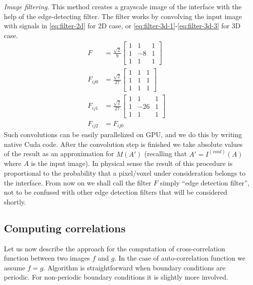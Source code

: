 \documentclass[reprint,amsmath,amssymb,aps,pre,showkeys,showpacs]{revtex4-1}
\begin{document}
\textit{Image filtering}. This method creates a grayscale image of the interface
with the help of the edge-detecting filter. The filter works by convolving the
input image with signals in \cref{eq:filter-2d} for 2D case, or
\cref{eq:filter-3d-1}-\cref{eq:filter-3d-3} for 3D case.
\begin{align}
  F &= \frac{\sqrt{2}}{9} \left[
    \begin{array}{ccc}
        1 & 1 & 1 \\
        1 & -8 & 1 \\
        1 & 1 & 1
      \end{array}
    \right] \label{eq:filter-2d} \\
  F_{ij0} &= \frac{\sqrt{2}}{27} \left[
    \begin{array}{ccc}
        1 & 1 & 1 \\
        1 & 1 & 1 \\
        1 & 1 & 1
    \end{array}
    \right] \label{eq:filter-3d-1} \\
  F_{ij1} &= \frac{\sqrt{2}}{27} \left[
    \begin{array}{ccc}
      1 & 1 & 1 \\
      1 & -26 & 1 \\
      1 & 1 & 1
    \end{array}
    \right] \label{eq:filter-3d-2} \\
  F_{ij2} &= F_{ij0} \label{eq:filter-3d-3}
\end{align}
Such convolutions can be easily parallelized on GPU, and we do this by writing
native Cuda code. After the convolution step is finished we take absolute values
of the result as an approximation for $M(A')$ (recalling that $A' =
I^{(void)}(A)$ where $A$ is the input image). In physical sense the result of
this procedure is proportional to the probability that a pixel/voxel under
consideration belongs to the interface. From now on we shall call the filter $F$
simply ``edge detection filter'', not to be confused with other edge detection
filters that will be considered shortly.

\subsection{Computing correlations}
\label{sec:cross-comp}
Let us now describe the approach for the computation of cross-correlation
function between two images $f$ and $g$. In the case of auto-correlation
function we assume $f = g$. Algorithm is straightforward when boundary
conditions are periodic. For non-periodic boundary conditions it is slightly
more involved.
\end{document}
